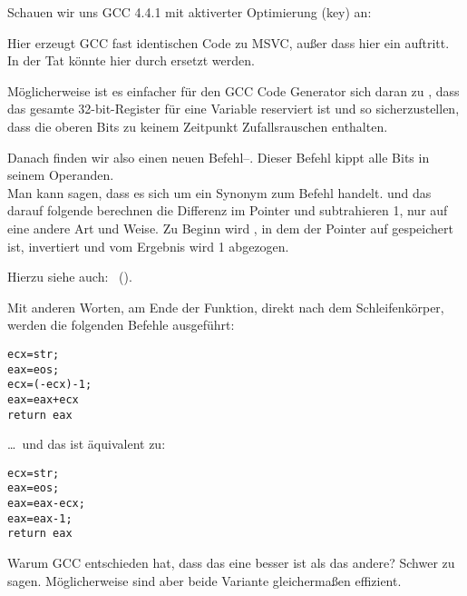 


Schauen wir uns GCC 4.4.1 mit aktiverter Optimierung (\Othree key) an:


 
Hier erzeugt GCC fast identischen Code zu MSVC, außer dass hier ein \MOVZX
auftritt. 
In der Tat könnte \MOVZX hier durch  ersetzt werden.
 
Möglicherweise ist es einfacher für den GCC Code Generator sich daran zu
, dass das gesamte 32-bit-\EDX Register für eine \Tchar Variable
reserviert ist und so sicherzustellen, dass die oberen Bits zu keinem Zeitpunkt
Zufallsrauschen enthalten.

\label{strlen_NOT_ADD}

Danach finden wir also einen neuen Befehl--\NOT. Dieser Befehl kippt alle Bits
in seinem Operanden.\\
Man kann sagen, dass es sich um ein Synonym zum Befehl 
handelt. 
\NOT und das darauf folgende \ADD berechnen die Differenz im Pointer und
subtrahieren 1, nur auf eine andere Art und Weise. 
Zu Beginn wird \ECX, in dem der Pointer auf  gespeichert ist, invertiert
und vom Ergebnis wird 1 abgezogen.

Hierzu siehe auch: \q{\SignedNumbersSectionName}~().
 
Mit anderen Worten, am Ende der Funktion, direkt nach dem Schleifenkörper,
werden die folgenden Befehle ausgeführt:

\begin{lstlisting}
ecx=str;
eax=eos;
ecx=(-ecx)-1; 
eax=eax+ecx
return eax
\end{lstlisting}

\dots~und das ist äquivalent zu:

\begin{lstlisting}
ecx=str;
eax=eos;
eax=eax-ecx;
eax=eax-1;
return eax
\end{lstlisting}

Warum GCC entschieden hat, dass das eine besser ist als das andere? Schwer zu
sagen.
Möglicherweise sind aber beide Variante gleichermaßen effizient.

